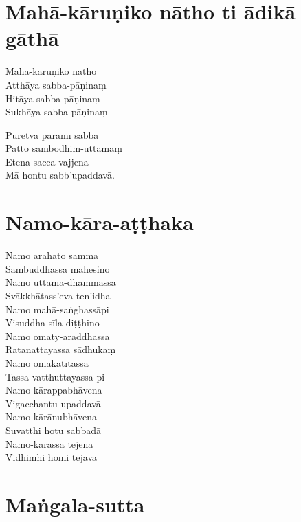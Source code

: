 \section{Mahā-kāruṇiko nātho ti ādikā gāthā}

\begin{paritta}
Mahā-kāruṇiko nātho\\
Atthāya sabba-pāṇinaṃ\\
Hitāya sabba-pāṇinaṃ\\
Sukhāya sabba-pāṇinaṃ

Pūretvā pāramī sabbā\\
Patto sambodhim-uttamaṃ\\
Etena sacca-vajjena\\
Mā hontu sabb'upaddavā. 
\end{paritta}

\vspace*{-0.6\baselineskip}

\enlargethispage{3\baselineskip}

\section{Namo-kāra-aṭṭhaka}

\begin{paritta}
Namo arahato sammā\\
Sambuddhassa mahesino\\
Namo uttama-dhammassa\\
Svākkhātass'eva ten'idha\\
Namo mahā-saṅghassāpi\\
Visuddha-sīla-diṭṭhino\\
Namo omāty-āraddhassa\\
Ratanattayassa sādhukaṃ\\
Namo omakātītassa\\
Tassa vatthuttayassa-pi\\
Namo-kārappabhāvena\\
Vigacchantu upaddavā\\
Namo-kārānubhāvena\\
Suvatthi hotu sabbadā\\
Namo-kārassa tejena\\
Vidhimhi homi tejavā 
\end{paritta}

\section{Maṅgala-sutta}

